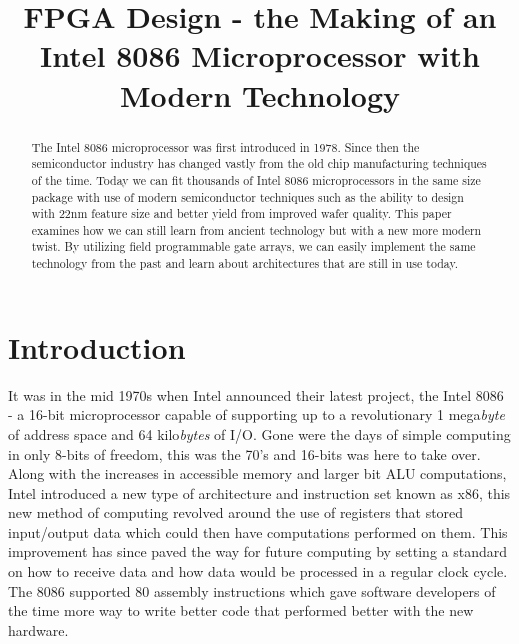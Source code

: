 \documentclass[conference]{IEEEtran}
\begin{document}
\title{FPGA Design - the Making of an Intel 8086 Microprocessor with Modern Technology}

\maketitle


\begin{abstract}
The Intel 8086 microprocessor was first introduced in 1978. Since then the semiconductor industry has changed vastly from the old chip manufacturing techniques of the time. Today we can fit thousands of Intel 8086 microprocessors in the same size package with use of modern semiconductor techniques such as the ability to design with 22nm feature size and better yield from improved wafer quality. This paper examines how we can still learn from ancient technology but with a new more modern twist. By utilizing field programmable gate arrays, we can easily implement the same technology from the past and learn about architectures that are still in use today.
\end{abstract}

\section{Introduction}
It was in the mid 1970s when Intel announced their latest project, the Intel 8086 -  a 16-bit microprocessor capable of supporting up to a revolutionary 1 mega{\em byte} of address space and 64 kilo{\em bytes} of I/O. Gone were the days of simple computing in only 8-bits of freedom, this was the 70's and 16-bits was here to take over. Along with the increases in accessible memory and larger bit ALU computations, Intel introduced a new type of architecture and instruction set known as x86, this new method of computing revolved around the use of registers that stored input/output data which could then have computations performed on them. This improvement has since paved the way for future computing by setting a standard on how to receive data and how data would be processed in a regular clock cycle. The 8086 supported 80 assembly instructions which gave software developers of the time more way to write better code that performed better with the new hardware.
\end{document}
